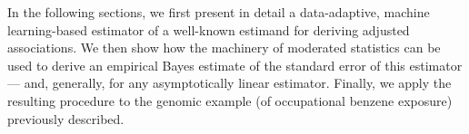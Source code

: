 In the following sections, we first present in detail a data-adaptive, machine
learning-based estimator of a well-known estimand for deriving adjusted
associations. We then show how the machinery of moderated statistics can be used
to derive an empirical Bayes estimate of the standard error of this estimator
--- and, generally, for any asymptotically linear estimator. Finally, we apply
the resulting procedure to the genomic example (of occupational benzene
exposure) previously described.
